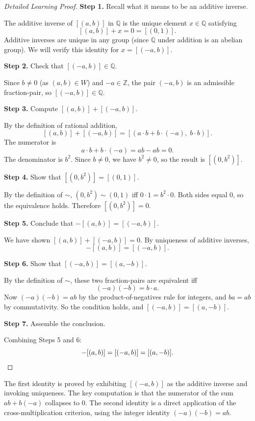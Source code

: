 \begin{proof}[Detailed Learning Proof]
\LRAProofBodyStart

\textbf{Step 1.} Recall what it means to be an additive inverse.

The additive inverse of $[(a,b)]$ in $\mathbb{Q}$ is the unique element
$x\in\mathbb{Q}$ satisfying
\[
[(a,b)] + x = 0 = [(0,1)].
\]
Additive inverses are unique in any group (since $\mathbb{Q}$ under
addition is an abelian group). We will verify this identity for
$x = [(-a,b)]$.

\textbf{Step 2.} Check that $[(-a,b)]\in\mathbb{Q}$.

Since $b\neq 0$ (as $(a,b)\in W$) and $-a\in\mathbb{Z}$, the pair
$(-a,b)$ is an admissible fraction-pair, so $[(-a,b)]\in\mathbb{Q}$.

\textbf{Step 3.} Compute $[(a,b)] + [(-a,b)]$.

By the definition of rational addition,
\[
[(a,b)] + [(-a,b)]
= [(a\cdot b + b\cdot(-a),\; b\cdot b)].
\]
The numerator is
\[
a\cdot b + b\cdot(-a) = ab - ab = 0.
\]
The denominator is $b^2$. Since $b\neq 0$, we have $b^2\neq 0$, so the
result is $[(0,b^2)]$.

\textbf{Step 4.} Show that $[(0,b^2)] = [(0,1)]$.

By the definition of $\sim$, $(0,b^2)\sim(0,1)$ iff $0\cdot 1 = b^2\cdot 0$.
Both sides equal $0$, so the equivalence holds. Therefore $[(0,b^2)] = 0$.

\textbf{Step 5.} Conclude that $-[(a,b)] = [(-a,b)]$.

We have shown $[(a,b)] + [(-a,b)] = 0$. By uniqueness of additive inverses,
\[
-[(a,b)] = [(-a,b)].
\]

\textbf{Step 6.} Show that $[(-a,b)] = [(a,-b)]$.

By the definition of $\sim$, these two fraction-pairs are equivalent iff
\[
(-a)(-b) = b\cdot a.
\]
Now $(-a)(-b) = ab$ by the product-of-negatives rule for integers, and
$ba = ab$ by commutativity. So the condition holds, and $[(-a,b)] = [(a,-b)]$.

\textbf{Step 7.} Assemble the conclusion.

Combining Steps 5 and 6:
\[
-[(a,b)] = [(-a,b)] = [(a,-b)]. \qedhere
\]
\end{proof}

\begin{remark*}
The first identity is proved by exhibiting $[(-a,b)]$ as the additive
inverse and invoking uniqueness. The key computation is that the numerator
of the sum $ab + b(-a)$ collapses to $0$. The second identity is a direct
application of the cross-multiplication criterion, using the integer identity
$(-a)(-b) = ab$.
\end{remark*}

